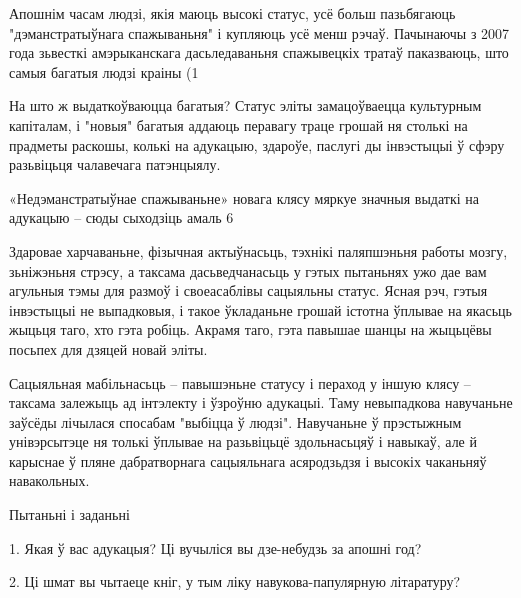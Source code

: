 Апошнім часам людзі, якія маюць высокі статус, усё больш пазьбягаюць "дэманстратыўнага спажываньня" і купляюць усё менш рэчаў. Пачынаючы з 2007 года зьвесткі амэрыканскага дасьледаваньня спажывецкіх тратаў паказваюць, што самыя багатыя людзі краіны (1%

На што ж выдаткоўваюцца багатыя? Статус эліты замацоўваецца культурным капіталам, і "новыя" багатыя аддаюць перавагу траце грошай ня столькі на прадметы раскошы, колькі на адукацыю, здароўе, паслугі ды інвэстыцыі ў сфэру разьвіцьця чалавечага патэнцыялу.

«Недэманстратыўнае спажываньне» новага клясу мяркуе значныя выдаткі на адукацыю – сюды сыходзіць амаль 6%

Здаровае харчаваньне, фізычная актыўнасьць, тэхнікі паляпшэньня работы мозгу, зьніжэньня стрэсу, а таксама дасьведчанасьць у гэтых пытаньнях ужо дае вам агульныя тэмы для размоў і своеасаблівы сацыяльны статус. Ясная рэч, гэтыя інвэстыцыі не выпадковыя, і такое ўкладаньне грошай істотна ўплывае на якасьць жыцьця таго, хто гэта робіць. Акрамя таго, гэта павышае шанцы на жыцьцёвы посьпех для дзяцей новай эліты.

Сацыяльная мабільнасьць – павышэньне статусу і пераход у іншую клясу – таксама залежыць ад інтэлекту і ўзроўню адукацыі. Таму невыпадкова навучаньне заўсёды лічылася спосабам "выбіцца ў людзі". Навучаньне ў прэстыжным унівэрсытэце ня толькі ўплывае на разьвіцьцё здольнасьцяў і навыкаў, але й карыснае ў пляне дабратворнага сацыяльнага асяродзьдзя і высокіх чаканьняў навакольных.

Пытаньні і заданьні

1. Якая ў вас адукацыя? Ці вучыліся вы дзе-небудзь за апошні год?

2. Ці шмат вы чытаеце кніг, у тым ліку навукова-папулярную літаратуру?

